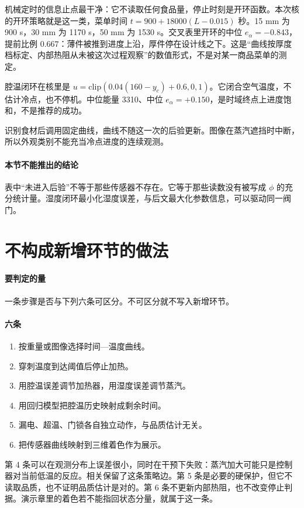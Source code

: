 机械定时的信息止点最干净：它不读取任何食品量，停止时刻是开环函数。本次核的开环策略就是这一类，菜单时间 \(t=900+18000(L-0.015)\) 秒。15 mm 为 900 s，30 mm 为 1170 s，50 mm 为 1530 s。交叉表里开环的中位 \(e_{\alpha}=-0.843\)，提前比例 \(0.667\)：薄件被推到进度上沿，厚件停在设计线之下。这是“曲线按厚度档标定、内部热阻从未被这次过程观察”的数值形式，不是对某一商品菜单的测定。

腔温闭环在核里是 \(u=\mathrm{clip}(0.04(160-y_c)+0.6,0,1)\)。它闭合空气温度，不估计冷点，也不停机。中位能量 3310、中位 \(e_{\alpha}=+0.150\)，是时域终点上进度饱和，不是推荐的成功。

识别食材后调用固定曲线，曲线不随这一次的后验更新。图像在蒸汽遮挡时中断，所以外观类别不能充当冷点进度的连续观测。

\paragraph{本节不能推出的结论}
表中“未进入后验”不等于那些传感器不存在。它等于那些读数没有被写成 \(\phi\) 的充分统计量。湿度闭环最小化湿度误差，与后文最大化参数信息，可以驱动同一阀门。

\section{不构成新增环节的做法}

\paragraph{要判定的量}
一条步骤是否与下列六条可区分。不可区分就不写入新增环节。

\paragraph{六条}
\begin{enumerate}
\item 按重量或图像选择时间—温度曲线。
\item 穿刺温度到达阈值后停止加热。
\item 用腔温误差调节加热器，用湿度误差调节蒸汽。
\item 用回归模型把腔温历史映射成剩余时间。
\item 漏电、超温、门锁各自独立动作，与品质估计无关。
\item 把传感器曲线映射到三维着色作为展示。
\end{enumerate}

第 4 条可以在观测分布上误差很小，同时在干预下失败：蒸汽加大可能只是控制器对当前低温的反应。相关保留了这条策略边。第 5 条是必要的硬保护，但它不读取品质，也不证明品质估计是对的。第 6 条不更新内部热阻，也不改变停止判据。演示章里的着色若不能指回状态分量，就属于这一条。

